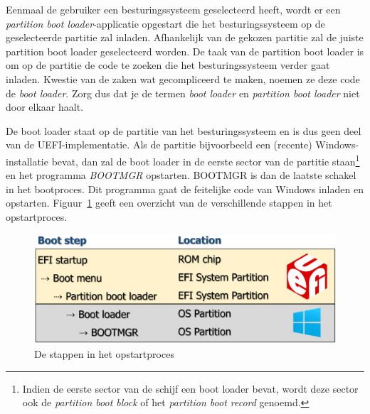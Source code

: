 Eenmaal de gebruiker een besturingssysteem geselecteerd heeft, wordt er een \emph{partition boot loader}-applicatie opgestart die het besturingssysteem op de geselecteerde partitie zal inladen. Afhankelijk van de gekozen
partitie zal de juiste partition boot loader geselecteerd worden. De taak van de partition boot loader is om op de partitie 
de code te zoeken die het besturingssysteem verder gaat inladen. Kwestie van de zaken wat gecompliceerd te maken, noemen ze deze code
de \emph{boot loader}. Zorg dus dat je de termen \emph{boot loader} en \emph{partition boot loader} niet door elkaar
haalt.

De boot loader staat op de partitie van het besturingssysteem en is dus geen deel van de UEFI-implementatie. Als de partitie
bijvoorbeeld een (recente) Windows-installatie bevat, dan zal de boot loader in de eerste sector van de partitie staan\footnote{Indien de eerste sector van de schijf een boot loader bevat, wordt deze sector ook de \emph{partition boot block} of het \emph{partition boot record} genoemd.} en het
programma \emph{BOOTMGR} opstarten. BOOTMGR is dan de laatste schakel in het bootproces. Dit programma gaat de feitelijke code van Windows inladen en opstarten. Figuur~\ref{bootsteps} geeft een overzicht van de verschillende stappen in het opstartproces.

\begin{figure}
\begin{center}
\includegraphics[width=125mm]{images/startupsteps.png}
\end{center}
\caption{De stappen in het opstartproces}
\label{bootsteps}
\end{figure}
